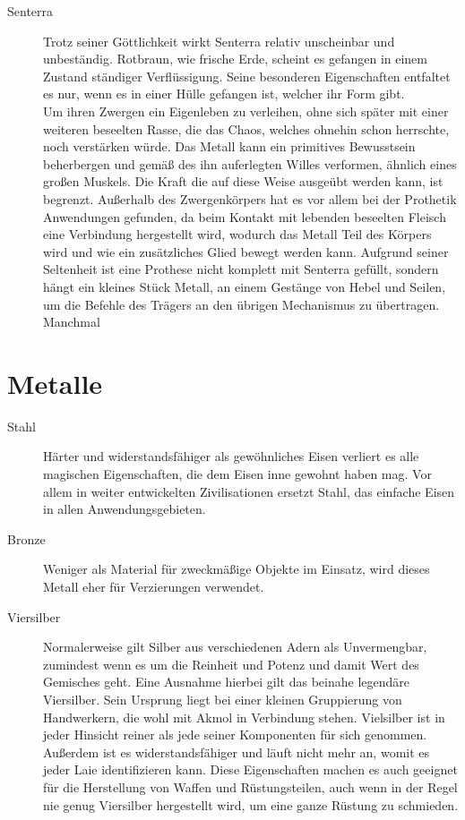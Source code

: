 \documentclass[a4paper,12pt,oneside]{book}
\begin{document}
\begin{description}
\item[Senterra] Trotz seiner Göttlichkeit wirkt Senterra relativ unscheinbar und unbeständig. Rotbraun, wie frische Erde, scheint es gefangen in einem Zustand ständiger Verflüssigung. Seine besonderen Eigenschaften entfaltet es nur, wenn es in einer Hülle gefangen ist, welcher ihr Form gibt.
\\Um ihren Zwergen ein Eigenleben zu verleihen, ohne sich später mit einer weiteren beseelten Rasse, die das Chaos, welches ohnehin schon herrschte, noch verstärken würde. Das Metall kann ein primitives Bewusstsein beherbergen und gemäß des ihn auferlegten Willes verformen, ähnlich eines großen Muskels. Die Kraft die auf diese Weise ausgeübt werden kann, ist begrenzt. Außerhalb des Zwergenkörpers hat es vor allem bei der Prothetik Anwendungen gefunden, da beim Kontakt mit lebenden beseelten Fleisch eine Verbindung hergestellt wird, wodurch das Metall Teil des Körpers wird und wie ein zusätzliches Glied bewegt werden kann. Aufgrund seiner Seltenheit ist eine Prothese nicht komplett mit Senterra gefüllt, sondern hängt ein kleines Stück Metall, an einem Gestänge von Hebel und Seilen, um die Befehle des Trägers an den übrigen Mechanismus zu übertragen. Manchmal 
\end{description}
\section{Metalle}
\begin{description}
\item[Stahl]Härter und widerstandsfähiger als gewöhnliches Eisen verliert es alle magischen Eigenschaften, die dem Eisen inne gewohnt haben mag. Vor allem in weiter entwickelten Zivilisationen ersetzt Stahl, das einfache Eisen in allen Anwendungsgebieten.
\item[Bronze]Weniger als Material für zweckmäßige Objekte im Einsatz, wird dieses Metall eher für Verzierungen verwendet.
\item[Viersilber]Normalerweise gilt Silber aus verschiedenen Adern als Unvermengbar, zumindest wenn es um die Reinheit und Potenz und damit Wert des Gemisches geht. Eine Ausnahme hierbei gilt das beinahe legendäre Viersilber. Sein Ursprung liegt bei einer kleinen Gruppierung von Handwerkern, die wohl mit Akmol in Verbindung stehen. Vielsilber ist in jeder Hinsicht reiner als jede seiner Komponenten für sich genommen. Außerdem ist es widerstandsfähiger und läuft nicht mehr an, womit es jeder Laie identifizieren kann. Diese Eigenschaften machen es auch geeignet für die Herstellung von Waffen und Rüstungsteilen, auch wenn in der Regel nie genug Viersilber hergestellt wird, um eine ganze Rüstung zu schmieden.
\end{description}
\end{document}
